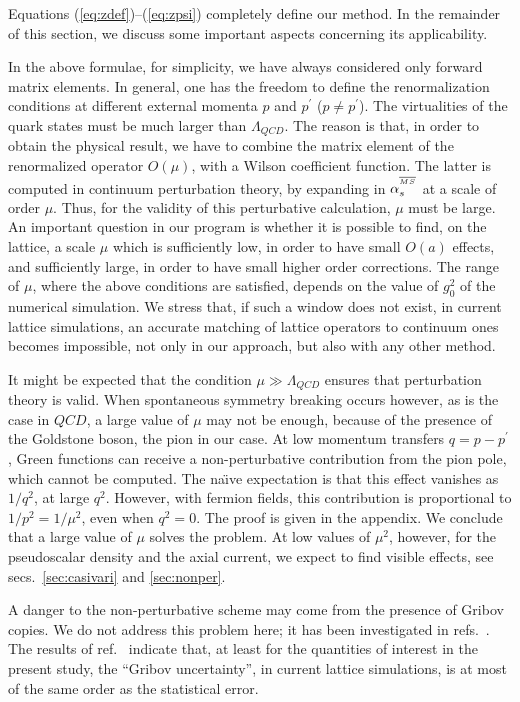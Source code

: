 Equations (\ref{eq:zdef})--(\ref{eq:zpsi}) completely define our method.
In the remainder of this section, we discuss some important aspects
concerning its applicability.

In the above formulae, for simplicity,
we have always
considered only forward matrix elements. In general, one has the freedom
to define the renormalization conditions at different external
momenta $p$ and $p^\prime$ ($p \neq p^\prime$).
The virtualities of the  quark states must be  much larger than
$\Lambda_{QCD}$.
 The reason is that, in
order to obtain the physical result, we have to combine the matrix element
of the renormalized operator $O(\mu)$, with a Wilson coefficient function.
The latter is computed
in continuum perturbation theory, by expanding in
$\alpha_s^{{}^{\overline{MS}}}$ at a scale of order $\mu$. Thus,
for the validity of this perturbative calculation, $\mu$ must be large.
An important question in our program is whether it is possible to find, on
the lattice, a scale $\mu$ which is sufficiently low, in order to
have small  $O(a)$ effects,
and sufficiently large, in order to have small higher order corrections.
The range of $\mu$, where the above conditions are satisfied, depends
on the value of $g_0^2$ of the numerical simulation.
We stress that, if such a  window
does not exist, in current lattice simulations,
an accurate matching of  lattice operators to
 continuum ones becomes impossible,
not only in our approach, but also with any other method.

It might be expected that the condition $\mu \gg \Lambda_{QCD}$ ensures
that perturbation
theory is valid. When
spontaneous symmetry breaking occurs however, as  is the case in $QCD$, a large
value of $\mu$ may  not be enough, because of the
presence of  the Goldstone boson, the pion in our case.
At low momentum transfers $q=
p-p^\prime$,  Green functions  can receive  a
non-perturbative contribution from
the pion pole, which cannot be computed. The na\"\i ve expectation is that this
 effect vanishes
 as $1/q^2$, at large $q^2$. However, with fermion fields, this
contribution is proportional to  $1/p^2=1/\mu^2$, even when $q^2=0$.
The proof is given in the appendix.
We conclude that a large value of $\mu$ solves the problem. At low values
of $\mu^2$, however, for the pseudoscalar density
and the axial current, we expect to find visible  effects,
see secs.\ \ref{sec:casivari} and \ref{sec:nonper}.

A  danger to the non-perturbative scheme may come from the
presence of  Gribov copies. We do not address  this problem here;
it  has been investigated in refs.\ \cite{altri,gribov}.
The results of
ref.\ \cite{gribov} indicate that,
at least for the quantities of interest in the present study,  the ``Gribov
uncertainty'', in current lattice simulations, is at most of the same order as
 the statistical error.

